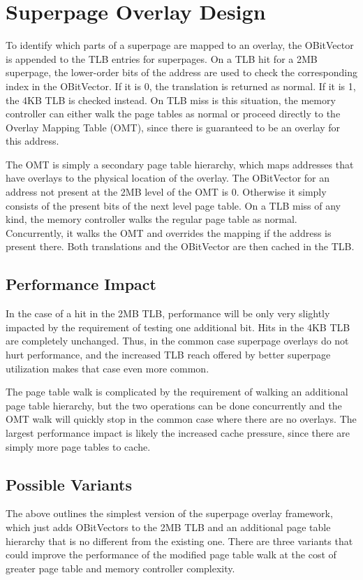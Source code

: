 \chapter{Superpage Overlay Design}

To identify which parts of a superpage are mapped to an overlay, the OBitVector is appended to the TLB entries for superpages. On a TLB hit for a 2MB superpage, the lower-order bits of the address are used to check the corresponding index in the OBitVector. If it is 0, the translation is returned as normal. If it is 1, the 4KB TLB is checked instead. On TLB miss is this situation, the memory controller can either walk the page tables as normal or proceed directly to the Overlay Mapping Table (OMT), since there is guaranteed to be an overlay for this address.

The OMT is simply a secondary page table hierarchy, which maps addresses that have overlays to the physical location of the overlay. The OBitVector for an address not present at the 2MB level of the OMT is 0. Otherwise it simply consists of the present bits of the next level page table. On a TLB miss of any kind, the memory controller walks the regular page table as normal. Concurrently, it walks the OMT and overrides the mapping if the address is present there. Both translations and the OBitVector are then cached in the TLB.

\section{Performance Impact}
In the case of a hit in the 2MB TLB, performance will be only very slightly impacted by the requirement of testing one additional bit. Hits in the 4KB TLB are completely unchanged. Thus, in the common case superpage overlays do not hurt performance, and the increased TLB reach offered by better superpage utilization makes that case even more common.

The page table walk is complicated by the requirement of walking an additional page table hierarchy, but the two operations can be done concurrently and the OMT walk will quickly stop in the common case where there are no overlays. The largest performance impact is likely the increased cache pressure, since there are simply more page tables to cache.

\section{Possible Variants}
The above outlines the simplest version of the superpage overlay framework, which just adds OBitVectors to the 2MB TLB and an additional page table hierarchy that is no different from the existing one. There are three variants that could improve the performance of the modified page table walk at the cost of greater page table and memory controller complexity.

